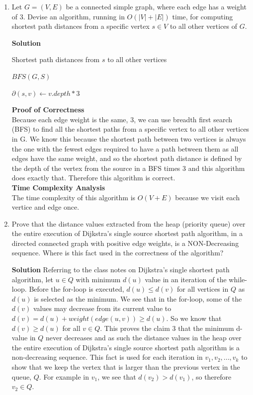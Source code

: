 \documentclass[12pt]{article}
\begin{document}
\begin{enumerate}
\item \color{blue} Let $G=(V,E)$ be a connected simple graph, where each edge has a weight of $3$. Devise an algorithm, running in $O(|V|+|E|)$ time, for computing shortest path distances from a specific vertex $s\in V$ to all other vertices of $G$. 

\color{black}
\textbf{Solution}
\begin{algorithm}
\caption{Shortest path distances from $s$ to all other vertices}
\begin{algorithmic}[1]
	\State $BFS(G,S)$ 
	
		\State $\partial(s,v) \gets v.depth * 3$ 
	
	\EndFor 
\EndProcedure
\end{algorithmic}
\end{algorithm}

\textbf{Proof of Correctness}\\
Because each edge weight is the same, 3, we can use breadth first search (BFS) to find all the shortest paths from a specific vertex to all other vertices in G. We know this because the shortest path between two vertices is always the one with the fewest edges required to have a path between them as all edges have the same weight, and so the shortest path distance is defined by the depth of the vertex from the source in a BFS times 3 and this algorithm does exactly that. Therefore this algorithm is correct.\\
\textbf{Time Complexity Analysis}\\
The time complexity of this algorithm is $O(V+E)$ because we visit each vertice and edge once.

\item\color{blue} Prove that the distance values extracted from the heap (priority queue) over the entire execution of Dijkstra's single source shortest path algorithm, in a directed connected graph with positive edge weights, is a NON-Decreasing 
sequence.  Where is this fact used in the correctness of the algorithm?

\color{black}\textbf{Solution}
Referring to the class notes on Dijkstra's single shortest path algorithm, let {$u \in Q$} with minimum $d(u)$ value in an iteration of the while-loop. Before the for-loop is executed, $d(u) \leq d(v)$ for all vertices in $Q$ as $d(u)$ is selected as the minimum. We see that in the for-loop, some of the $d(v)$ values may decrease from its current value to $d(v) = d(u) + weight(edge(u,v)) \geq d(u)$. So we know that $d(v) \geq d(u)$ for all $v \in Q$. This proves the claim 3 that the minimum d-value in $Q$ never decreases and as such the distance values in the heap over the entire execution of Dijkstra's single source shortest path algorithm is  a non-decreasing sequence.  This fact is used for each iteration in $v_1, v_2, ... , v_k$ to show that we keep the vertex that is larger than the previous vertex in the queue, $Q$. For example in $v_1$, we see that $d(v_2)>d(v_1)$, so therefore $v_2 \in Q$.


\end{enumerate}
\end{document}
